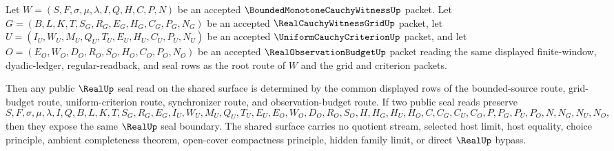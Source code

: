 \begin{theorem}
\label{thm:bounded-monotone-cauchy-witness-root-real-seal-determinacy}
Let $W=(S,F,\sigma,\mu,\lambda,I,Q,H,C,P,N)$ be an accepted $\BoundedMonotoneCauchyWitnessUp$ packet. Let $G=(B,L,K,T,S_G,R_G,E_G,H_G,C_G,P_G,N_G)$ be an accepted $\RealCauchyWitnessGridUp$ packet, let $U=(I_U,W_U,M_U,Q_U,T_U,E_U,H_U,C_U,P_U,N_U)$ be an accepted $\UniformCauchyCriterionUp$ packet, and let $O=(E_O,W_O,D_O,R_O,S_O,H_O,C_O,P_O,N_O)$ be an accepted $\RealObservationBudgetUp$ packet reading the same displayed finite-window, dyadic-ledger, regular-readback, and seal rows as the root route of $W$ and the grid and criterion packets.

Then any public $\RealUp$ seal read on the shared surface is determined by the common displayed rows of the bounded-source route, grid-budget route, uniform-criterion route, synchronizer route, and observation-budget route. If two public seal reads preserve
$$
S,F,\sigma,\mu,\lambda,I,Q,B,L,K,T,S_G,R_G,E_G,I_U,W_U,M_U,Q_U,T_U,E_U,E_O,W_O,D_O,R_O,S_O,H,H_G,H_U,H_O,C,C_G,C_U,C_O,P,P_G,P_U,P_O,N,N_G,N_U,N_O,
$$
then they expose the same $\RealUp$ seal boundary. The shared surface carries no quotient stream, selected host limit, host equality, choice principle, ambient completeness theorem, open-cover compactness principle, hidden family limit, or direct $\RealUp$ bypass.
\end{theorem}
